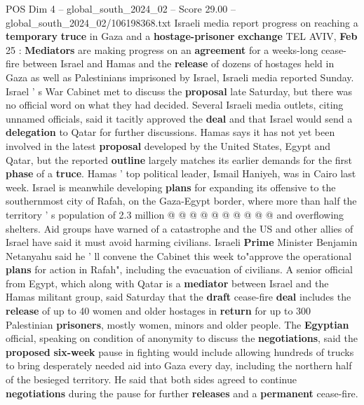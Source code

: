 \begin{textsample}{POS Dim 4 – global\_south\_2024\_02 – Score 29.00 – global\_south\_2024\_02/106198368.txt}  \label{ex:f4_pos_071}
Israeli media report progress on reaching a \textbf{temporary} \textbf{truce} in Gaza and a \textbf{hostage-prisoner} \textbf{exchange} TEL AVIV, \textbf{Feb} 25 : \textbf{Mediators} are making progress on an \textbf{agreement} for a weeks-long cease-fire between Israel and Hamas and the \textbf{release} of dozens of hostages held in Gaza as well as Palestinians imprisoned by Israel, Israeli media reported Sunday.
Israel ' s War Cabinet met to discuss the \textbf{proposal} late Saturday, but there was no official word on what they had decided.
Several Israeli media outlets, citing unnamed officials, said it tacitly approved the \textbf{deal} and that Israel would send a \textbf{delegation} to Qatar for further discussions.
Hamas says it has not yet been involved in the latest \textbf{proposal} developed by the United States, Egypt and Qatar, but the reported \textbf{outline} largely matches its earlier demands for the first \textbf{phase} of a \textbf{truce}.
Hamas ' top political leader, Ismail Haniyeh, was in Cairo last week.
Israel is meanwhile developing \textbf{plans} for expanding its offensive to the southernmost city of Rafah, on the Gaza-Egypt border, where more than half the territory ' s population of 2.3 million @ @ @ @ @ @ @ @ @ @ and overflowing shelters.
Aid groups have warned of a catastrophe and the US and other allies of Israel have said it must avoid harming civilians.
Israeli \textbf{Prime} Minister Benjamin Netanyahu said he ' ll convene the Cabinet this week to"approve the operational \textbf{plans} for action in Rafah", including the evacuation of civilians.
A senior official from Egypt, which along with Qatar is a \textbf{mediator} between Israel and the Hamas militant group, said Saturday that the \textbf{draft} cease-fire \textbf{deal} includes the \textbf{release} of up to 40 women and older hostages in \textbf{return} for up to 300 Palestinian \textbf{prisoners}, mostly women, minors and older people.
The \textbf{Egyptian} official, speaking on condition of anonymity to discuss the \textbf{negotiations}, said the \textbf{proposed} \textbf{six-week} pause in fighting would include allowing hundreds of trucks to bring desperately needed aid into Gaza every day, including the northern half of the besieged territory.
He said that both sides agreed to continue \textbf{negotiations} during the pause for further \textbf{releases} and a \textbf{permanent} cease-fire.

\end{textsample}

